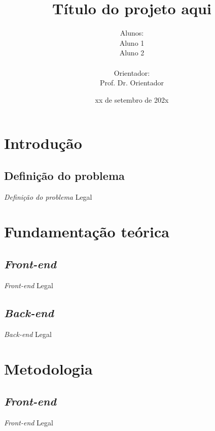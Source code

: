 \documentclass[presentation]{beamer}
\title{Título do projeto aqui}
\date{xx de setembro de 202x}
\author[Nome no rodapé]{Alunos:\\Aluno 1\\Aluno 2\\~\\Orientador:\\Prof. Dr. Orientador}
\institute{UnB | ENE}
\begin{document}
\frame{\titlepage}


\section{Introdução}

\subsection{Definição do problema}

\begin{frame}{\textit{Definição do problema}}
    Legal
\end{frame}


\section{Fundamentação teórica}

\subsection{\textit{Front-end}}

\begin{frame}{\textit{Front-end}}
    Legal
\end{frame}

\subsection{\textit{Back-end}}

\begin{frame}{\textit{Back-end}}
    Legal
\end{frame}


\section{Metodologia}

\subsection{\textit{Front-end}}

\begin{frame}{\textit{Front-end}}
    Legal
\end{frame}
\end{document}
